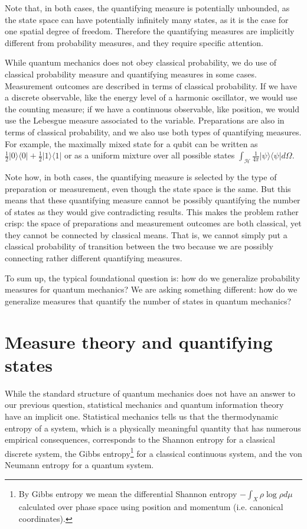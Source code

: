 \documentclass[10pt,twocolumn, nofootinbib]{revtex4-2}
\def\>{\rangle}
\def\<{\langle}
\begin{document}
Note that, in both cases, the quantifying measure is potentially unbounded, as the state space can have potentially infinitely many states, as it is the case for one spatial degree of freedom. Therefore the quantifying measures are implicitly different from probability measures, and they require specific attention.

While quantum mechanics does not obey classical probability, we do use of classical probability measure and quantifying measures in some cases. Measurement outcomes are described in terms of classical probability. If we have a discrete observable, like the energy level of a harmonic oscillator, we would use the counting measure; if we have a continuous observable, like position, we would use the Lebesgue measure associated to the variable. Preparations are also in terms of classical probability, and we also use both types of quantifying measures. For example, the maximally mixed state for a qubit can be written as $\frac{1}{2} | 0 \> \< 0 | + \frac{1}{2} | 1 \> \< 1 | $ or as a uniform mixture over all possible states $\int_\mathcal{H} \frac{1}{4\pi} | \psi \> \< \psi | d\Omega$.

Note how, in both cases, the quantifying measure is selected by the type of preparation or measurement, even though the state space is the same. But this means that these quantifying measure cannot be possibly quantifying the number of states as they would give contradicting results. This makes the problem rather crisp: the space of preparations and measurement outcomes are both classical, yet they cannot be connected by classical means. That is, we cannot simply put a classical probability of transition between the two because we are possibly connecting rather different quantifying measures.

To sum up, the typical foundational question is: how do we generalize probability measures for quantum mechanics? We are asking something different: how do we generalize measures that quantify the number of states in quantum mechanics?

\section{Measure theory and quantifying states}

While the standard structure of quantum mechanics does not have an answer to our previous question, statistical mechanics and quantum information theory have an implicit one. Statistical mechanics tells us that the thermodynamic entropy of a system, which is a physically meaningful quantity that has numerous empirical consequences, corresponds to the Shannon entropy for a classical discrete system, the Gibbs entropy\footnote{By Gibbs entropy we mean the differential Shannon entropy $-\int_X \rho \log \rho d\mu$ calculated over phase space using position and momentum (i.e. canonical coordinates).} for a classical continuous system, and the von Neumann entropy for a quantum system.
\end{document}
